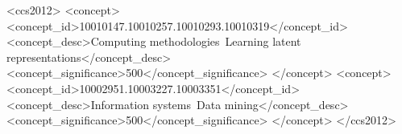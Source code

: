 \documentclass[sigconf]{acmart}
\newcommand{\hide}[1]{} %
\begin{document}





\begin{CCSXML}
<ccs2012>
<concept>
<concept_id>10010147.10010257.10010293.10010319</concept_id>
<concept_desc>Computing methodologies~Learning latent representations</concept_desc>
<concept_significance>500</concept_significance>
</concept>
<concept>
<concept_id>10002951.10003227.10003351</concept_id>
<concept_desc>Information systems~Data mining</concept_desc>
<concept_significance>500</concept_significance>
</concept>
</ccs2012>
\end{CCSXML}



\end{document}
